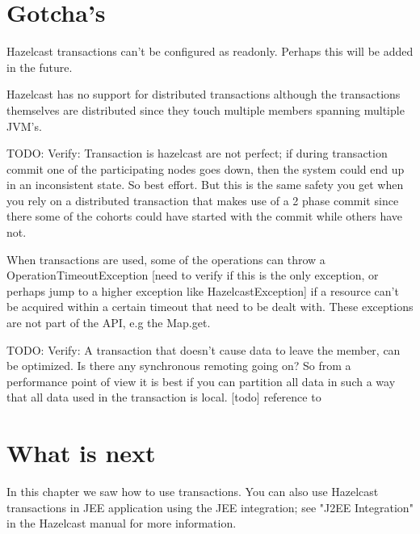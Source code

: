 \section{Gotcha's}
Hazelcast transactions can't be configured as readonly. Perhaps this will be added in the future.

Hazelcast has no support for distributed transactions although the transactions themselves are distributed since they touch multiple members spanning multiple JVM's.

TODO: Verify: Transaction is hazelcast are not perfect; if during transaction commit one of the participating nodes goes down, then the system could end up in an inconsistent state. So best effort. But this is the same safety you get when you rely on a distributed transaction that makes use of a 2 phase commit since there some of the cohorts could have started with the commit while others have not.

When transactions are used, some of the operations can throw a OperationTimeoutException [need to verify if this is the only exception, or perhaps jump to a higher exception like HazelcastException] if a resource can't be acquired within a certain timeout that need to be dealt with. These exceptions are not part of the API, e.g the Map.get.

TODO: Verify: A transaction that doesn't cause data to leave the member, can be optimized. Is there any synchronous remoting going on? So from a performance point of view it is best if you can partition all data in such a way that all data used in the transaction is local. [todo] reference to 

\section{What is next}
In this chapter we saw how to use transactions. You can also use Hazelcast transactions in JEE application using the JEE integration; see "J2EE Integration" in the Hazelcast manual for more information.